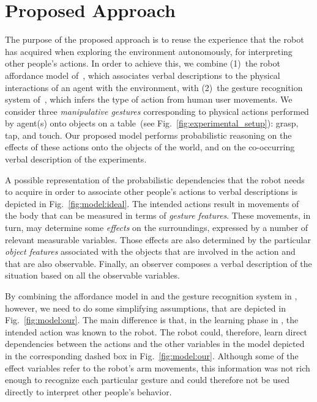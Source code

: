 \section{Proposed Approach}
The purpose of the proposed approach is to reuse the experience that the robot has acquired when exploring the environment autonomously, for interpreting other people's actions.
In order to achieve this, we combine (1)~the robot affordance model of~\cite{salvi:2012:smcb}, which associates verbal descriptions to the physical interactions of an agent with the environment, with (2)~the gesture recognition system of~\cite{saponaro:2013:crhri}, which infers the type of action from human user movements.
We consider three \emph{manipulative gestures} corresponding to physical actions performed by agent(s) onto objects on a table~(see Fig.~\ref{fig:experimental_setup}): grasp, tap, and touch.
Our proposed model performs probabilistic reasoning on the effects of these actions onto the objects of the world, and on the co-occurring verbal description of the experiments.

A possible representation of the probabilistic dependencies that the robot needs to acquire in order to associate other people's actions to verbal descriptions is depicted in Fig.~\ref{fig:model:ideal}.
The intended actions result in movements of the body that can be measured in terms of \emph{gesture features}.
These movements, in turn, may determine some \emph{effects} on the surroundings, expressed by a number of relevant measurable variables.
Those effects are also determined by the particular \emph{object features} associated with the objects that are involved in the action and that are also observable.
Finally, an observer composes a verbal description of the situation based on all the observable variables.

By combining the affordance model in \cite{salvi:2012:smcb} and the gesture recognition system in \cite{saponaro:2013:crhri}, however, we need to do some simplifying assumptions, that are depicted in Fig.~\ref{fig:model:our}.
The main difference is that, in the learning phase in \cite{salvi:2012:smcb}, the intended action was known to the robot.
The robot could, therefore, learn direct dependencies between the actions and the other variables in the \affwords{} model depicted in the corresponding dashed box in Fig.~\ref{fig:model:our}.
Although some of the effect variables refer to the robot's arm movements, this information was not rich enough to recognize each particular gesture and could therefore not be used directly to interpret other people's behavior.

